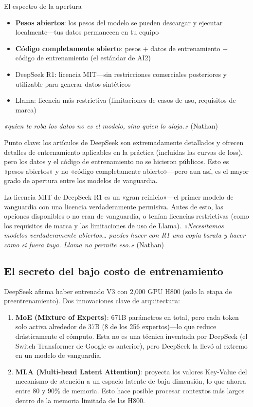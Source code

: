 \begin{knowledgebox}{El espectro de la apertura}
\begin{itemize}
    \item \textbf{Pesos abiertos}: los pesos del modelo se pueden descargar y ejecutar localmente—tus datos permanecen en tu equipo
    \item \textbf{Código completamente abierto}: pesos + datos de entrenamiento + código de entrenamiento (el estándar de AI2)
    \item DeepSeek R1: licencia MIT—sin restricciones comerciales posteriores y utilizable para generar datos sintéticos
    \item Llama: licencia más restrictiva (limitaciones de casos de uso, requisitos de marca)
\end{itemize}

\textit{«quien te roba los datos no es el modelo, sino quien lo aloja.»} (Nathan)

Punto clave: los artículos de DeepSeek son extremadamente detallados y ofrecen detalles de entrenamiento aplicables en la práctica (incluidas las curvas de loss), pero los datos y el código de entrenamiento no se hicieron públicos. Esto es «pesos abiertos» y no «código completamente abierto»—pero aun así, es el mayor grado de apertura entre los modelos de vanguardia.

La licencia MIT de DeepSeek R1 es un «gran reinicio»—el primer modelo de vanguardia con una licencia verdaderamente permisiva. Antes de esto, las opciones disponibles o no eran de vanguardia, o tenían licencias restrictivas (como los requisitos de marca y las limitaciones de uso de Llama). \textit{«Necesitamos modelos verdaderamente abiertos… puedes hacer con R1 una copia barata y hacer como si fuera tuya. Llama no permite eso.»} (Nathan)
\end{knowledgebox}

\subsection{El secreto del bajo costo de entrenamiento}

DeepSeek afirma haber entrenado V3 con 2,000 GPU H800 (solo la etapa de preentrenamiento). Dos innovaciones clave de arquitectura:

\begin{enumerate}
    \item \textbf{MoE (Mixture of Experts)}: 671B parámetros en total, pero cada token solo activa alrededor de 37B (8 de los 256 expertos)—lo que reduce drásticamente el cómputo. Esta no es una técnica inventada por DeepSeek (el Switch Transformer de Google es anterior), pero DeepSeek la llevó al extremo en un modelo de vanguardia.
    \item \textbf{MLA (Multi-head Latent Attention)}: proyecta los valores Key-Value del mecanismo de atención a un espacio latente de baja dimensión, lo que ahorra entre 80 y 90\% de memoria. Esto hace posible procesar contextos más largos dentro de la memoria limitada de las H800.
\end{enumerate}

